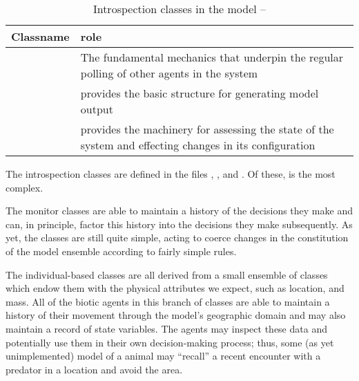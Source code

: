 \begin{table}[H]
\begin{center}
  \caption{Introspection classes in the model -- \label{classtable2}}
  \begin{tabular}{l L{7cm}}
    \toprule
    \textbf{Classname} & \textbf{role} \\
    \midrule
     & The fundamental mechanics that
      underpin the regular polling of other agents in the system\\
     & {provides the basic structure for generating model output}\\
     & {provides the machinery for assessing the state
      of the system and effecting changes in its configuration}\\
    \bottomrule
  \end{tabular}
\end{center}
\end{table}
The introspection classes are defined in the files
, , and
.  Of these,  is the
most complex.

The monitor classes are able to maintain a history of the decisions
they make and can, in principle, factor this history into the
decisions they make subsequently.  As yet, the \mmonitor classes are
still quite simple, acting to coerce changes in the constitution of
the model ensemble according to fairly simple rules.




The individual-based classes are all derived from a small ensemble of
classes which endow them with the physical attributes we expect, such
as location, and mass. All of the biotic agents in this branch of
classes are able to maintain a history of their movement through the
model's geographic domain and may also maintain a record of state
variables. The agents may inspect these data and potentially use them
in their own decision-making process; thus, some (as yet
unimplemented) model of a animal may ``recall'' a recent encounter
with a predator in a location and avoid the area.

